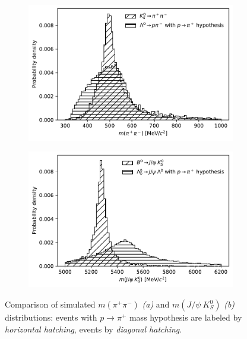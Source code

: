 \begin{figure}[t]
	\centering
	\begin{subfigure}{.45\textwidth}
		\includegraphics[width=\textwidth]{graphics/04-event_selection/phys_bkg_ks_comparison.pdf}
		\caption{}
		\label{fig:4:phys_bkg_ks}
	\end{subfigure}
	\begin{subfigure}{.45\textwidth}
		\includegraphics[width=\textwidth]{graphics/04-event_selection/phys_bkg_b0_comparison.pdf}
		\caption{}
		\label{fig:4:phys_bkg_b0}
	\end{subfigure}
	\caption{Comparison of simulated $m(\pi^+\pi^-)$ \textit{(a)} and $m(J/\psi~K^0_S)$ \textit{(b)} distributions: \demonstratorshort events with $p\rightarrow \pi^+$ mass hypothesis are labeled by \textit{horizontal hatching}, \physbkgshort events by \textit{diagonal hatching}.}
	\label{fig:4:phys_bkg_distributions}
\end{figure}

